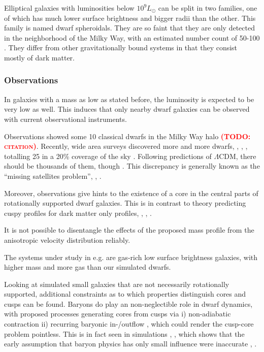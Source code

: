 \documentclass[useAMS,usenatbib]{mn2e}
\newcommand{\TODO}[1]{\textsc{\textbf{\textcolor{red}{(TODO: #1)}}}}
\begin{document}
Elliptical galaxies with luminosities below $10^9L_\odot$ can be split
in two families, one of which has much lower surface brightness and
bigger radii than the other. This family is named dwarf
spheroidals. They are so faint that they are only detected in
the neighborhood of the Milky Way, with an estimated number count of
50-100 \citep{Belokurov2007}. They differ from other gravitationally
bound systems in that they consist mostly of dark matter.

\subsubsection{Observations}
In galaxies with a mass as low as stated before, the luminosity is
expected to be very low as well. This induces that only nearby dwarf
galaxies can be observed with current observational instruments.

Observations showed some 10 classical dwarfs in the Milky Way halo
\TODO{citation}. Recently, wide area surveys discovered more and more
dwarfs, \citep{Belokurov2007}, \citep{Belokurov2009},
\citep{Belokurov2010}, totalling 25 in a 20\% coverage of the sky
\citep{Koposov2008}. Following predictions of $\Lambda$CDM, there
should be thousands of them, though \cite{Diemand2007}. This
discrepancy is generally known as the ``missing satellites problem'',
\citep{Moore1999}, \citep{Klypin1999}.

Moreover, observations give hints to the existence of a core in the
central parts of rotationally supported dwarf galaxies. This is in
contrast to theory predicting cuspy profiles for dark matter only
profiles, \citep{Moore1994}, \citep{Flores1994}, \citep{Moore1999a}.  

It is not possible to disentangle the effects of the proposed mass
profile from the anisotropic velocity distribution reliably.

The systems under study in e.g. \cite{deBlok2001} are gas-rich low
surface brightness galaxies, with higher mass and more gas than our
simulated dwarfs.

Looking at simulated small galaxies that are not necessarily
rotationally supported, additional constraints as to which properties
distinguish cores and cusps can be found. Baryons do play an
non-neglectible role in dwarf dynamics, with proposed processes
generating cores from cusps via i) non-adiabatic contraction ii)
recurring baryonic in-/outflow \citep{Read2005}, which could render the
cusp-core problem pointless. This is in fact seen in simulations
\citep{Mashchenko2008}, \citep{Governato2009}, which shows that the
early assumption that baryon physics has only small influence were
inaccurate \citep{Navarro1996}, \citep{Gnedin2002}.
\end{document}
